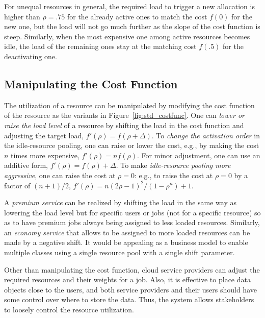 For unequal resources in general, the required load to trigger a new
allocation is higher than $\rho = .75$ for the already
active ones to match the cost $f(0)$ for the new one, but the load
will not go much further as the slope of the cost function is steep.
Similarly, when the most expensive one among active resources becomes
idle, the load of the remaining ones stay at the matching cost
$f(.5)$ for the deactivating one.


\subsection{Manipulating the Cost Function}
\label{sec:variation}

The utilization of a resource can be manipulated by modifying the cost
function of the resource as the variants in Figure~\ref{fig:std_costfunc}.
One can {\em lower or raise the load level} of a resource by shifting
the load in the cost function and adjusting the target load,
$f'(\rho) = f(\rho + \Delta)$.
To {\em change the activation order} in the idle-resource pooling,
one can raise or lower the cost,
e.g., by making the cost  $n$ times more expensive, $f'(\rho) = n f(\rho)$.
For minor adjustment, one can use an additive form,
$f'(\rho) = f(\rho) + \Delta$.
To make {\em idle-resource pooling more aggressive},
one can raise the cost at $\rho = 0$:
e.g., to raise the cost at $\rho = 0$ by a factor of $(n+1)/2$,
$f'(\rho) = n (2\rho - 1)^{2}/(1 - \rho^{n}) + 1$.

A {\em premium service} can be realized by shifting the load
in the same way as lowering the load level
but for specific users or jobs (not for a specific resource) so as to
have premium jobs always being assigned to less loaded resources.
Similarly, an {\em economy service} that allows to be assigned to more
loaded resources can be made by a negative shift.
It would be appealing as a business model to enable multiple classes using a single
resource pool with a single shift parameter.


Other than manipulating the cost function,
cloud service providers can adjust the required resources and their
weights for a job.  Also, it is effective to place data objects close to the
users, and both service providers and their users should have some
control over where to store the data.
Thus, the system allows stakeholders to loosely control the
resource utilization.
